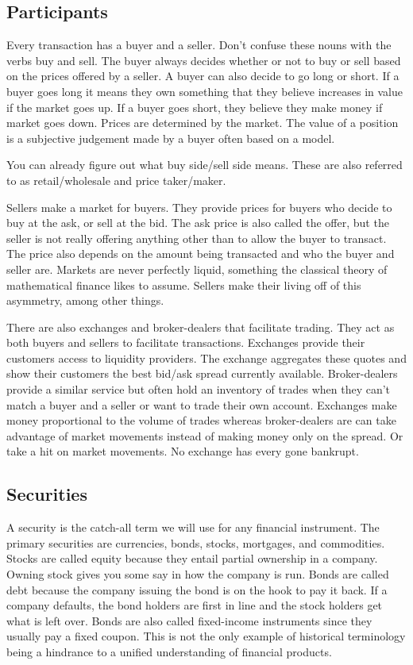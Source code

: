 \documentclass[]{article}
\begin{document}
\subsection{Participants}\label{participants}

Every transaction has a buyer and a seller. Don't confuse these nouns
with the verbs buy and sell. The buyer always decides whether or not to
buy or sell based on the prices offered by a seller. A buyer can also
decide to go long or short. If a buyer goes long it means they own
something that they believe increases in value if the market goes up. If
a buyer goes short, they believe they make money if market goes down.
Prices are determined by the market. The value of a position is a
subjective judgement made by a buyer often based on a model.

You can already figure out what buy side/sell side means. These are also
referred to as retail/wholesale and price taker/maker.

Sellers make a market for buyers. They provide prices for buyers who
decide to buy at the ask, or sell at the bid. The ask price is also
called the offer, but the seller is not really offering anything other
than to allow the buyer to transact. The price also depends on the
amount being transacted and who the buyer and seller are. Markets are
never perfectly liquid, something the classical theory of mathematical
finance likes to assume. Sellers make their living off of this
asymmetry, among other things.

There are also exchanges and broker-dealers that facilitate trading.
They act as both buyers and sellers to facilitate transactions.
Exchanges provide their customers access to liquidity providers. The
exchange aggregates these quotes and show their customers the best
bid/ask spread currently available. Broker-dealers provide a similar
service but often hold an inventory of trades when they can't match a
buyer and a seller or want to trade their own account. Exchanges make
money proportional to the volume of trades whereas broker-dealers are
can take advantage of market movements instead of making money only on
the spread. Or take a hit on market movements. No exchange has every
gone bankrupt.

\subsection{Securities}\label{securities}

A security is the catch-all term we will use for any financial
instrument. The primary securities are currencies, bonds, stocks,
mortgages, and commodities. Stocks are called equity because they entail
partial ownership in a company. Owning stock gives you some say in how
the company is run. Bonds are called debt because the company issuing
the bond is on the hook to pay it back. If a company defaults, the bond
holders are first in line and the stock holders get what is left over.
Bonds are also called fixed-income instruments since they usually pay a
fixed coupon. This is not the only example of historical terminology
being a hindrance to a unified understanding of financial products.
\end{document}
